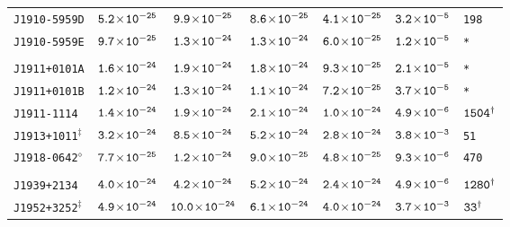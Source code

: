 \begin{longtable}{l | c | c | c | c | c | l}
\scriptsize{\tt{J1910-5959D}} & \scriptsize{$\tt{5.2\!\times\!10^{-25}}$} & \scriptsize{$\tt{9.9\!\times\!10^{-25}}$} & \scriptsize{$\tt{8.6\!\times\!10^{-25}}$} &\scriptsize{$\tt{4.1\!\times\!10^{-25}}$} & \scriptsize{$\tt{3.2\!\times\!10^{-5}}$} & \scriptsize{\tt{198}} \\[-16pt] 
\scriptsize{\tt{J1910-5959E}} & \scriptsize{$\tt{9.7\!\times\!10^{-25}}$} & \scriptsize{$\tt{1.3\!\times\!10^{-24}}$} & \scriptsize{$\tt{1.3\!\times\!10^{-24}}$} & \scriptsize{$\tt{6.0\!\times\!10^{-25}}$} & \scriptsize{$\tt{1.2\!\times\!10^{-5}}$} & \scriptsize{\tt{*}} \\[-16pt] 
\\[-20pt] 
\scriptsize{\tt{J1911+0101A}} & \scriptsize{$\tt{1.6\!\times\!10^{-24}}$} & \scriptsize{$\tt{1.9\!\times\!10^{-24}}$} & \scriptsize{$\tt{1.8\!\times\!10^{-24}}$} & \scriptsize{$\tt{9.3\!\times\!10^{-25}}$} & \scriptsize{$\tt{2.1\!\times\!10^{-5}}$} & \scriptsize{\tt{*}} \\[-16pt] 
\scriptsize{\tt{J1911+0101B}} & \scriptsize{$\tt{1.2\!\times\!10^{-24}}$} & \scriptsize{$\tt{1.3\!\times\!10^{-24}}$} & \scriptsize{$\tt{1.1\!\times\!10^{-24}}$} & \scriptsize{$\tt{7.2\!\times\!10^{-25}}$} & \scriptsize{$\tt{3.7\!\times\!10^{-5}}$} & \scriptsize{\tt{*}} \\[-16pt] 
\scriptsize{\tt{J1911-1114}} & \scriptsize{$\tt{1.4\!\times\!10^{-24}}$} & \scriptsize{$\tt{1.9\!\times\!10^{-24}}$} & \scriptsize{$\tt{2.1\!\times\!10^{-24}}$} & \scriptsize{$\tt{1.0\!\times\!10^{-24}}$} & \scriptsize{$\tt{4.9\!\times\!10^{-6}}$} & \scriptsize{$\tt{1504^{\dagger}}$} \\[-16pt] 
\scriptsize{\tt{J1913+1011}$^{\ddagger}$} & \scriptsize{$\tt{3.2\!\times\!10^{-24}}$} &
\scriptsize{$\tt{8.5\!\times\!10^{-24}}$} & \scriptsize{$\tt{5.2\!\times\!10^{-24}}$} &\scriptsize{$\tt{2.8\!\times\!10^{-24}}$} &
\scriptsize{$\tt{3.8\!\times\!10^{-3}}$} & \scriptsize{\tt{51}} \\[-16pt] 
\scriptsize{\tt{J1918-0642}$^{\diamond}$} & \scriptsize{$\tt{7.7\!\times\!10^{-25}}$} &
\scriptsize{$\tt{1.2\!\times\!10^{-24}}$} & \scriptsize{$\tt{9.0\!\times\!10^{-25}}$} &\scriptsize{$\tt{4.8\!\times\!10^{-25}}$} &
\scriptsize{$\tt{9.3\!\times\!10^{-6}}$} & \scriptsize{\tt{470}} \\[-16pt] 
\\[-20pt] 
\scriptsize{\tt{J1939+2134}} & \scriptsize{$\tt{4.0\!\times\!10^{-24}}$} & \scriptsize{$\tt{4.2\!\times\!10^{-24}}$} & \scriptsize{$\tt{5.2\!\times\!10^{-24}}$} & \scriptsize{$\tt{2.4\!\times\!10^{-24}}$} & \scriptsize{$\tt{4.9\!\times\!10^{-6}}$} & \scriptsize{$\tt{1280^{\dagger}}$} \\[-16pt] 
\scriptsize{\tt{J1952+3252}$^{\ddagger}$} & \scriptsize{$\tt{4.9\!\times\!10^{-24}}$} &
\scriptsize{$\tt{10.0\!\times\!10^{-24}}$} & \scriptsize{$\tt{6.1\!\times\!10^{-24}}$} & \scriptsize{$\tt{4.0\!\times\!10^{-24}}$}
& \scriptsize{$\tt{3.7\!\times\!10^{-3}}$} & \scriptsize{$\tt{33^{\dagger}}$} \\[-16pt] 

\end{longtable}
